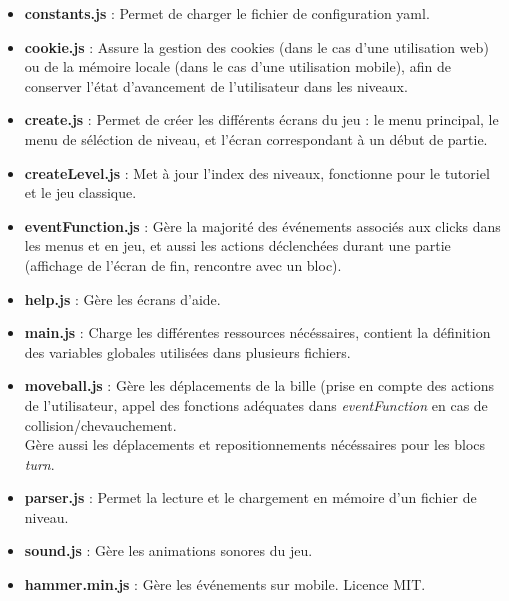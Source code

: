 \documentclass[11pt]{article}
\begin{document}
\begin{itemize}
	\item
		\textbf{constants.js} : Permet de charger le fichier de 
		configuration yaml.\\
	\item
		\textbf{cookie.js} : Assure la gestion des cookies (dans le
		cas d'une utilisation web) ou de la mémoire locale (dans 
		le cas d'une utilisation mobile), afin de conserver l'état 
		d'avancement de l'utilisateur dans les niveaux.\\
	\item
		\textbf{create.js} : Permet de créer les différents écrans du
		jeu : le menu principal, le menu de séléction de niveau, et 
		l'écran correspondant à un début de partie.\\
	\item
		\textbf{createLevel.js} : Met à jour l'index des niveaux, 
		fonctionne pour le tutoriel et le jeu classique.\\
	\item
		\textbf{eventFunction.js} : Gère la majorité des événements 
		associés aux clicks dans les menus et en jeu, et aussi les 
		actions déclenchées durant une partie (affichage de l'écran de 
		fin, rencontre avec un bloc).\\
	\item
		\textbf{help.js} : Gère les écrans d'aide.\\
	\item
		\textbf{main.js} : Charge les différentes ressources 
		nécéssaires, contient la définition des variables globales 
		utilisées dans plusieurs fichiers.\\
	\item
		\textbf{moveball.js} : Gère les déplacements de la bille 
		(prise en compte des actions de l'utilisateur, appel des 
		fonctions adéquates dans {\em eventFunction} en cas de 
		collision/chevauchement.\\
		Gère aussi les déplacements et repositionnements nécéssaires 
		pour les blocs {\em turn}.\\
	\item
		\textbf{parser.js} : Permet la lecture et le chargement en 
		mémoire d'un fichier de niveau.\\
	\item
		\textbf{sound.js} : Gère les animations sonores du jeu.\\
	\item
		\textbf{hammer.min.js} : Gère les événements sur mobile. Licence
		MIT.\\

\end{itemize}
\end{document}
